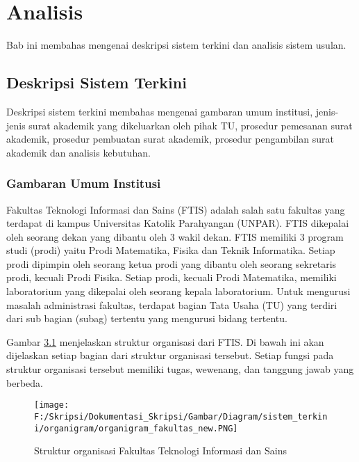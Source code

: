 \chapter{Analisis}
\label{chap:analisis}
Bab ini membahas mengenai deskripsi sistem terkini dan analisis sistem usulan.

\section{Deskripsi Sistem Terkini}
\label{sec:deskripsi_sistem_terkini}
Deskripsi sistem terkini membahas mengenai gambaran umum institusi, jenis-jenis surat akademik yang dikeluarkan oleh pihak TU, prosedur pemesanan surat akademik, prosedur pembuatan surat akademik, prosedur pengambilan surat akademik dan analisis kebutuhan. \\

\subsection{Gambaran Umum Institusi}
\label{sec:gambaran_umum_institusi}
Fakultas Teknologi Informasi dan Sains (FTIS) adalah salah satu fakultas yang terdapat di kampus Universitas Katolik Parahyangan (UNPAR). FTIS dikepalai oleh seorang dekan yang dibantu oleh 3 wakil dekan. FTIS memiliki 3 program studi (prodi) yaitu Prodi Matematika, Fisika dan Teknik Informatika. Setiap prodi dipimpin oleh seorang ketua prodi yang dibantu oleh seorang sekretaris prodi, kecuali Prodi Fisika. Setiap prodi, kecuali Prodi Matematika, memiliki laboratorium yang dikepalai oleh seorang kepala laboratorium. Untuk mengurusi masalah administrasi fakultas, terdapat bagian Tata Usaha (TU) yang terdiri dari sub bagian (subag) tertentu yang mengurusi bidang tertentu.\

Gambar \hyperlink{organigram_fakultas}{3.1} menjelaskan struktur organisasi dari FTIS. Di bawah ini akan dijelaskan  setiap bagian dari struktur organisasi tersebut. Setiap fungsi pada struktur organisasi tersebut memiliki tugas, wewenang, dan tanggung jawab yang berbeda.
\begin{figure}[H]
	\centering
		\texttt{[image: F:/Skripsi/Dokumentasi\_Skripsi/Gambar/Diagram/sistem\_terkini/organigram/organigram\_fakultas\_new.PNG]}
	\caption{Struktur organisasi Fakultas Teknologi Informasi dan Sains}
	\label{fig:organigram_fakultas}
\end{figure}

